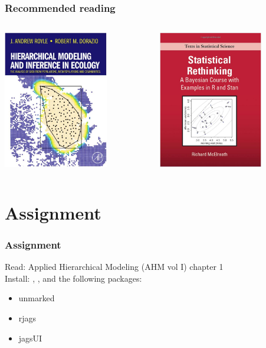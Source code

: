\documentclass[color=usenames,dvipsnames]{beamer}\usepackage[]{graphicx}\usepackage[]{xcolor}
\begin{document}
\begin{frame}
\begin{columns}
\begin{column}{0.33\textwidth}
    \end{column} 
  \end{columns} 
\end{frame}


\begin{frame}
  \frametitle{Recommended reading}
  \begin{columns}[c]
    \setlength\fboxsep{0pt}
    \begin{column}{0.5\textwidth}
      \centering
      \includegraphics[height=6cm]{figs/RoyleDorazioBookCover} \\
    \end{column}
    \hfill
    \begin{column}{0.5\textwidth}
      \centering
      \includegraphics[height=6cm]{figs/McElreathBookCover} \\
    \end{column}
  \end{columns}
\end{frame}



\section{Assignment}


\begin{frame}
  \frametitle{Assignment}
  \large
  Read: Applied Hierarchical Modeling (AHM vol I) chapter 1 \\
  \vfill
  Install: \href{https://sourceforge.net/projects/mcmc-jags/files/}{\jags},
  \href{https://www.r-project.org/}{\R}, and the following packages:
  \begin{itemize}
    \tt
    \item unmarked
    \item rjags
    \item jagsUI
  \end{itemize}
\end{frame}
\end{document}
